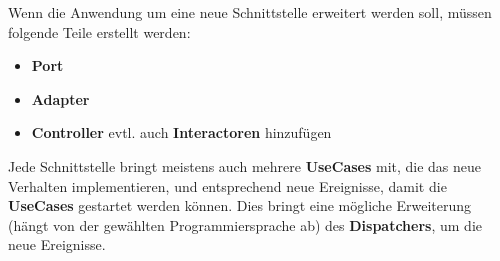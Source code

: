 Wenn die Anwendung um eine neue Schnittstelle erweitert werden soll, müssen folgende Teile erstellt werden:
\begin{itemize}
    \item \textbf{Port}
    \item \textbf{Adapter}
    \item \textbf{Controller} evtl. auch \textbf{Interactoren} hinzufügen
\end{itemize}

Jede Schnittstelle bringt meistens auch mehrere \textbf{UseCases} mit, die das neue Verhalten implementieren, und entsprechend neue 
Ereignisse, damit die \textbf{UseCases} gestartet werden können. 
Dies bringt eine mögliche Erweiterung (hängt von der gewählten Programmiersprache ab) des \textbf{Dispatchers}, um die neue Ereignisse.
